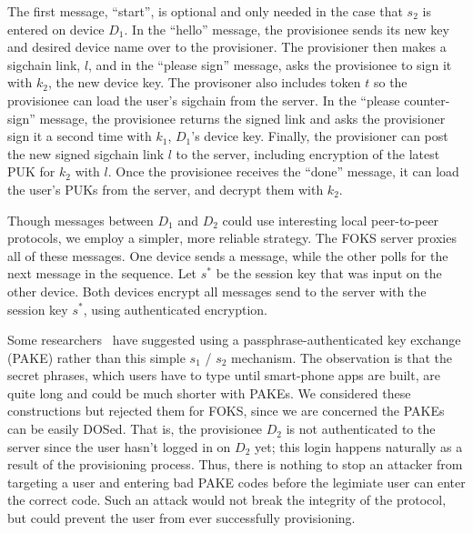 \begin{center}
\end{center}

The first message, ``start'', is optional and only needed in the case that $s_2$
is entered on device $D_1$. In the ``hello'' message, the provisionee sends its
new key and desired device name over to the provisioner. The provisioner then
makes a sigchain link, $l$, and in the ``please sign'' message, asks the
provisionee to sign it with $k_2$, the new device key. The provisoner also
includes token $t$ so the provisionee can load the user's sigchain from the
server. In the ``please counter-sign'' message, the provisionee returns the
signed link and asks the provisioner sign it a second time with $k_1$, $D_1$'s
device key. Finally, the provisioner can post the new signed sigchain link $l$
to the server, including encryption of the latest PUK for $k_2$ with $l$. Once
the provisionee receives the ``done'' message, it can load the user's PUKs from
the server, and decrypt them with $k_2$.

Though messages between $D_1$ and $D_2$ could use interesting local peer-to-peer
protocols, we employ a simpler, more reliable strategy. The FOKS server proxies
all of these messages. One device sends a message, while the other polls for the
next message in the sequence. Let $s^{*}$ be the session key that was input on
the other device. Both devices encrypt all messages send to the server with the
session key $s^{*}$, using authenticated encryption.

Some researchers~\cite{ncc2019} have suggested using a passphrase-authenticated
key exchange (PAKE) rather than this simple $s_1$ / $s_2$ mechanism. The
observation is that the secret phrases, which users have to type until
smart-phone apps are built, are quite long and could be much shorter with PAKEs.
We considered these constructions but rejected them for FOKS, since we are
concerned the PAKEs can be easily DOSed. That is, the provisionee $D_2$ is not
authenticated to the server since the user hasn't logged in on $D_2$ yet; this
login happens naturally as a result of the provisioning process. Thus, there is
nothing to stop an attacker from targeting a user and entering bad PAKE codes
before the legimiate user can enter the correct code. Such an attack would not
break the integrity of the protocol, but could prevent the user from ever
successfully provisioning.

